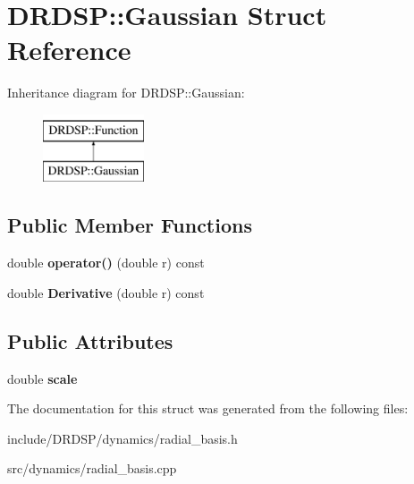 \hypertarget{struct_d_r_d_s_p_1_1_gaussian}{\section{D\-R\-D\-S\-P\-:\-:Gaussian Struct Reference}
\label{struct_d_r_d_s_p_1_1_gaussian}
}
Inheritance diagram for D\-R\-D\-S\-P\-:\-:Gaussian\-:\begin{figure}[H]
\begin{center}
\leavevmode
\includegraphics[height=2.000000cm]{struct_d_r_d_s_p_1_1_gaussian}
\end{center}
\end{figure}
\subsection*{Public Member Functions}
\begin{DoxyCompactItemize}
\item 
\hypertarget{struct_d_r_d_s_p_1_1_gaussian_aff703aa9e683cce46f56a41d173d2643}{double {\bfseries operator()} (double r) const }\label{struct_d_r_d_s_p_1_1_gaussian_aff703aa9e683cce46f56a41d173d2643}

\item 
\hypertarget{struct_d_r_d_s_p_1_1_gaussian_a9ae975cdc5b2bbc1ae2e1c3725f48890}{double {\bfseries Derivative} (double r) const }\label{struct_d_r_d_s_p_1_1_gaussian_a9ae975cdc5b2bbc1ae2e1c3725f48890}

\end{DoxyCompactItemize}
\subsection*{Public Attributes}
\begin{DoxyCompactItemize}
\item 
\hypertarget{struct_d_r_d_s_p_1_1_gaussian_a54c0ec40d9295e0167e6216912f01d2a}{double {\bfseries scale}}\label{struct_d_r_d_s_p_1_1_gaussian_a54c0ec40d9295e0167e6216912f01d2a}

\end{DoxyCompactItemize}


The documentation for this struct was generated from the following files\-:\begin{DoxyCompactItemize}
\item 
include/\-D\-R\-D\-S\-P/dynamics/radial\-\_\-basis.\-h\item 
src/dynamics/radial\-\_\-basis.\-cpp\end{DoxyCompactItemize}
